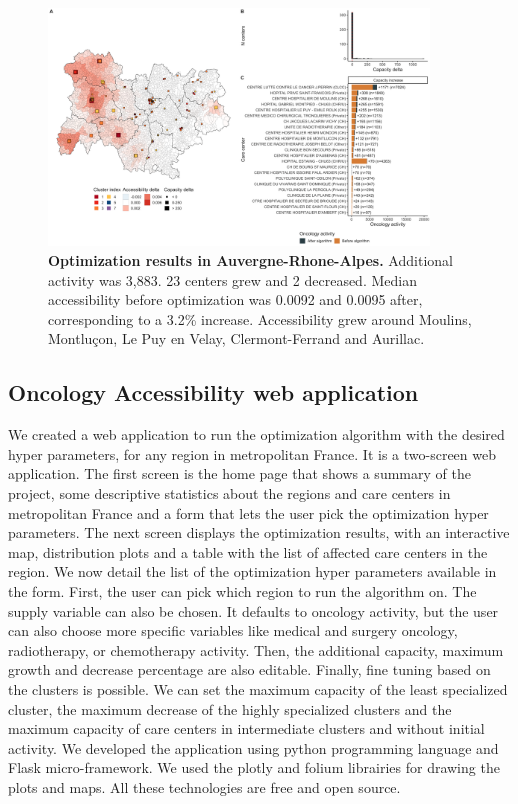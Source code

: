 \begin{figure}[h!]
    \includegraphics[width=0.9\textwidth]{images/camion/optim_region/optim_Auvergne-Rhone-Alpes.png}
    \centering
    \caption{ \textbf{Optimization results in Auvergne-Rhone-Alpes.} Additional
        activity was 3,883. 23 centers grew and 2 decreased. Median
        accessibility before optimization was 0.0092 and 0.0095 after,
        corresponding to a 3.2\% increase. Accessibility grew around Moulins,
        Montluçon, Le Puy en Velay, Clermont-Ferrand and Aurillac. }
\end{figure}

\subsection{Oncology Accessibility web application}

We created a web application to run the optimization algorithm with the desired
hyper parameters, for any region in metropolitan France. It is a two-screen web
application. The first screen is the home page that shows a summary of the
project, some descriptive statistics about the regions and care centers in
metropolitan France and a form that lets the user pick the optimization hyper
parameters. The next screen displays the optimization results, with an
interactive map, distribution plots and a table with the list of affected care
centers in the region. We now detail the list of the optimization hyper
parameters available in the form. First, the user can pick which region to run
the algorithm on. The supply variable can also be chosen. It defaults to
oncology activity, but the user can also choose more specific variables like
medical and surgery oncology, radiotherapy, or chemotherapy activity. Then, the
additional capacity, maximum growth and decrease percentage are also editable.
Finally, fine tuning based on the clusters is possible. We can set the maximum
capacity of the least specialized cluster, the maximum decrease of the highly
specialized clusters and the maximum capacity of care centers in intermediate
clusters and without initial activity. We developed the application using python
programming language and Flask micro-framework. We used the plotly and folium
librairies for drawing the plots and maps. All these technologies are free and
open source.

